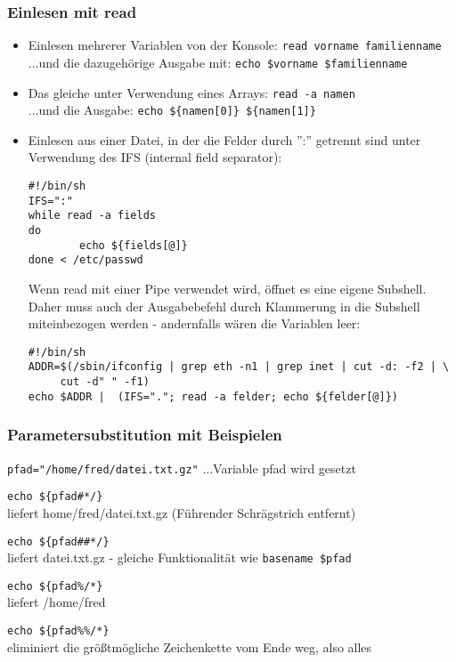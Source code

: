 \documentclass[11pt]{article}
\begin{document}
\subsubsection{Einlesen mit read}
\begin{itemize}
\item Einlesen mehrerer Variablen von der Konsole:
\texttt{read vorname familienname}\\
...und die dazugehörige Ausgabe mit:
\texttt{echo \$vorname \$familienname}

\item Das gleiche unter Verwendung eines Arrays:
\texttt{read -a namen}\\
...und die Ausgabe:
\texttt{echo \$\{namen[0]\} \$\{namen[1]\}}

\item Einlesen aus einer Datei, in der die Felder durch '':'' getrennt
sind unter Verwendung des IFS (internal field separator):
\begin{verbatim}
#!/bin/sh
IFS=":"
while read -a fields
do
        echo ${fields[@]}
done < /etc/passwd
\end{verbatim}

Wenn read mit einer Pipe verwendet wird, öffnet es eine eigene Subshell.
Daher muss auch der Ausgabebefehl durch Klammerung in die Subshell
miteinbezogen werden - andernfalls wären die Variablen leer:
\begin{verbatim}
#!/bin/sh
ADDR=$(/sbin/ifconfig | grep eth -n1 | grep inet | cut -d: -f2 | \
     cut -d" " -f1)
echo $ADDR |  (IFS="."; read -a felder; echo ${felder[@]})
\end{verbatim}
\end{itemize}

\subsubsection{Parametersubstitution mit Beispielen}
\texttt{pfad="/home/fred/datei.txt.gz"} ...Variable pfad wird
gesetzt

\texttt{echo \$\{pfad\#*/\}}\\
liefert home/fred/datei.txt.gz (Führender Schrägstrich entfernt)

\texttt{echo \$\{pfad\#\#*/\}}\\
liefert datei.txt.gz - gleiche Funktionalität wie 
\texttt{basename \$pfad}

\texttt{echo \$\{pfad\%/*\}}\\
liefert /home/fred

\texttt{echo \$\{pfad\%\%/*\}}\\
eliminiert die größtmögliche Zeichenkette vom Ende weg, also alles
\end{document}

